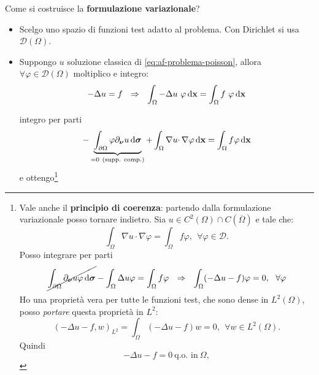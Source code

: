 Come si costruisce la \textbf{formulazione variazionale}?
\begin{itemize}
    \item Scelgo uno spazio di funzioni test adatto al problema. Con Dirichlet si usa $\displaystyle \mathcal{D}(\Omega)$.
    \item Suppongo $u$ soluzione classica di \eqref{eq:af-problema-poisson}, allora $\displaystyle \forall \varphi \in \mathcal{D}(\Omega)$ moltiplico e integro:
          \begin{equation*}
              -\Delta u=f\ \ \Rightarrow \ \ \int _{\Omega } -\Delta u\ \varphi \dxx =\int _{\Omega } f\ \varphi \dxx
          \end{equation*}

          integro per parti
          \begin{equation*}
              -\underbrace{\int _{\partial \Omega } \varphi \partial _{\bm{\nu }} u\dsig }_{=0\ \text{(supp. comp.)}} +\int _{\Omega } \nabla u\cdotp \nabla \varphi \dxx =\int _{\Omega } f\varphi \dxx
          \end{equation*}
          \newpage
          e ottengo\footnote{Vale anche il \textbf{principio di coerenza}: partendo dalla formulazione variazionale posso tornare indietro. Sia $\displaystyle u\in C^{2}(\Omega) \cap C(\overline{\Omega })$ e tale che:
              \begin{equation*}
                  \int _{\Omega } \nabla u\cdotp \nabla \varphi =\int _{\Omega } f\varphi ,\ \ \forall \varphi \in \mathcal{D} .
              \end{equation*}
              Posso integrare per parti
              \begin{equation*}
                  \cancel{\int _{\partial \Omega } \partial _{\bm{\nu}} u\varphi \,\mathrm d \bm{\sigma} } -\int _{\Omega } \Delta u\varphi =\int _{\Omega } f\varphi \ \ \Rightarrow \ \ \int _{\Omega }(-\Delta u-f) \varphi =0,\ \ \forall \varphi
              \end{equation*}
              Ho una proprietà vera per tutte le funzioni test, che sono dense in $\displaystyle L^{2}(\Omega)$, posso \textit{portare} questa proprietà in $\displaystyle L^{2}$:
              \begin{equation*}
                  (-\Delta u-f,w)_{L^{2}} =\int _{\Omega }(-\Delta u-f) w=0,\ \ \forall w\in L^{2}(\Omega) .
              \end{equation*}
              Quindi
              \begin{equation*}
                  -\Delta u-f=0\ \text{q.o. in} \ \Omega ,

\end{equation*}}
\end{itemize}
